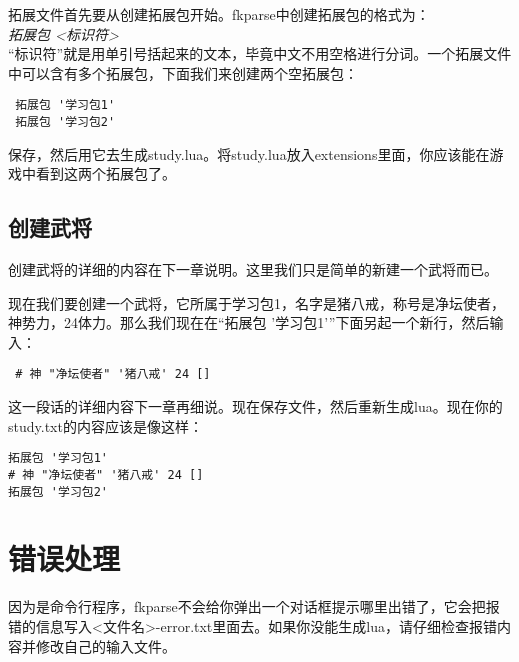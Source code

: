 拓展文件首先要从创建拓展包开始。fkparse中创建拓展包的格式为：\\

\emph{拓展包 <标识符>} \\

“标识符”就是用单引号括起来的文本，毕竟中文不用空格进行分词。一个拓展文件中可以含有多个拓展包，下面我们来创建两个空拓展包：

\begin{verbatim}
 拓展包 '学习包1'
 拓展包 '学习包2'
\end{verbatim}

保存，然后用它去生成study.lua。将study.lua放入extensions里面，你应该能在游戏中看到这两个拓展包了。

\subsection{创建武将}

创建武将的详细的内容在下一章说明。这里我们只是简单的新建一个武将而已。

现在我们要创建一个武将，它所属于学习包1，名字是猪八戒，称号是净坛使者，神势力，24体力。那么我们现在在“拓展包 '学习包1'”下面另起一个新行，然后输入：

\begin{verbatim}
 # 神 "净坛使者" '猪八戒' 24 []
\end{verbatim}

这一段话的详细内容下一章再细说。现在保存文件，然后重新生成lua。现在你的study.txt的内容应该是像这样：

\begin{verbatim}
拓展包 '学习包1'
# 神 "净坛使者" '猪八戒' 24 []
拓展包 '学习包2'
\end{verbatim}

\section{错误处理}

因为是命令行程序，fkparse不会给你弹出一个对话框提示哪里出错了，它会把报错的信息写入<文件名>-error.txt里面去。如果你没能生成lua，请仔细检查报错内容并修改自己的输入文件。
